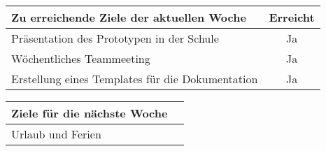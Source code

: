 \begin{tabularx}{\textwidth}{Xc}
    \arrayrulecolor{OliveGreen}
    \toprule
    {\bfseries Zu erreichende Ziele der aktuellen Woche} & {\bfseries Erreicht} \\
    \midrule[2pt]
    Präsentation des Prototypen in der Schule           &Ja                     \\
    \rowcolor{OliveGreen!15}
    Wöchentliches Teammeeting                           &Ja                     \\
    \rowcolor{White}
    Erstellung eines Templates für die Dokumentation    &Ja                     \\
    \bottomrule[2pt]
\end{tabularx}
%
\vspace{1cm}
%
\begin{tabularx}{\textwidth}{Xc}
    \arrayrulecolor{OliveGreen}
    \toprule
    {\bfseries Ziele für die nächste Woche}              &                      \\
    \midrule[2pt]
    Urlaub und Ferien                                    &                      \\
\end{tabularx}

